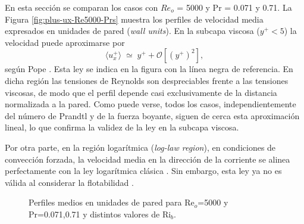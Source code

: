 En esta sección se comparan los casos con $Re_o$ = 5000 y Pr = 0.071 y 0.71. La Figura \ref{fig:plus-ux-Re5000-Prs} muestra los perfiles de velocidad media expresados en unidades de pared (\textit{wall units}). En la subcapa viscosa ($y^+ < 5$) la velocidad puede aproximarse por
$$\langle u_x^+ \rangle \;\simeq\; y^+ + \mathcal{O} \left[(y^+)^{2} \right],$$
según Pope \cite{pope2001turbulent}. Esta ley se indica en la figura con la línea negra de referencia. En dicha región las tensiones de Reynolds son despreciables frente a las tensiones viscosas, de modo que el perfil depende casi exclusivamente de la distancia normalizada a la pared. Como puede verse, todos los casos, independientemente del número de Prandtl y de la fuerza boyante, siguen de cerca esta aproximación lineal, lo que confirma la validez de la ley en la subcapa viscosa. 

Por otra parte, en la región logarítmica (\textit{log-law region}), en condiciones de convección forzada, la velocidad media en la dirección de la corriente se alinea perfectamente con la ley logarítmica clásica \cite{kawamura2000dns}. Sin embargo, esta ley ya no es válida al considerar la flotabilidad \cite{zhou2024direct}. 

\begin{figure}[H]
  \centering
  \caption{Perfiles medios en unidades de pared para Re$_o$=5000 y Pr=0.071,0.71 y distintos valores de Ri$_b$.}
  \label{fig:Re5000-Pr071}
\end{figure}

